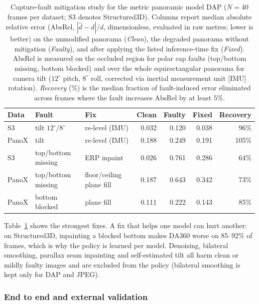\documentclass{article}
\newcommand{\absrel}{AbsRel}
\begin{document}
\begin{table}[t]\centering\small
\caption{Capture-fault mitigation study for the metric panoramic model DAP ($N=40$ frames per dataset; S3 denotes Structured3D). Columns report median absolute relative error (\absrel{}, $|\hat d - d|/d$, dimensionless, evaluated in raw metres; lower is better) on the unmodified panorama (\emph{Clean}), the degraded panorama without mitigation (\emph{Faulty}), and after applying the listed inference-time fix (\emph{Fixed}). \absrel{} is measured on the occluded region for polar cap faults (top/bottom missing, bottom blocked) and over the whole equirectangular panorama for camera tilt ($12^\circ$ pitch, $8^\circ$ roll, corrected via inertial measurement unit [IMU] rotation). \emph{Recovery} (\%) is the median fraction of fault-induced error eliminated across frames where the fault increases \absrel{} by at least $5\%$.}\label{tab:faults}
\begin{tabular}{lllrrrr}\toprule
Data & Fault & Fix & Clean & Faulty & Fixed & Recovery\\\midrule
S3 & tilt $12^\circ/8^\circ$ & re-level (IMU) & 0.032 & 0.120 & 0.038 & 96\%\\
PanoX & tilt & re-level (IMU) & 0.188 & 0.249 & 0.191 & 105\%\\
S3 & top/bottom missing & ERP inpaint & 0.026 & 0.761 & 0.286 & 64\%\\
PanoX & top/bottom missing & floor/ceiling plane fill & 0.187 & 0.643 & 0.342 & 73\%\\
PanoX & bottom blocked & plane fill & 0.111 & 0.222 & 0.143 & 85\%\\
\bottomrule\end{tabular}
\end{table}
Table~\ref{tab:faults} shows the strongest fixes. A fix that helps one model can hurt another: on Structured3D, inpainting a blocked bottom makes DA360 worse on 85--92\% of frames, which is why the policy is learned per model. Denoising, bilateral smoothing, parallax seam inpainting and self-estimated tilt all harm clean or mildly faulty images and are excluded from the policy (bilateral smoothing is kept only for DAP and JPEG).

\subsubsection{End to end and external validation}
\end{document}
